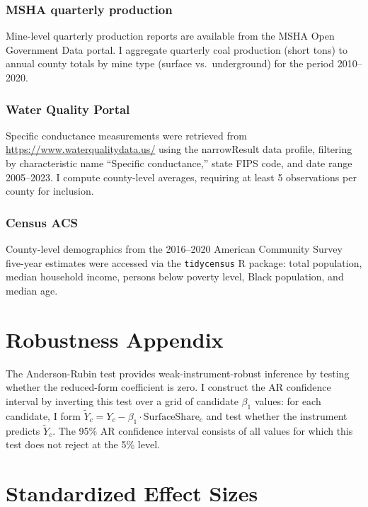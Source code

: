 \documentclass[12pt]{article}
\begin{document}
\subsubsection*{MSHA quarterly production} Mine-level quarterly production reports are available from the MSHA Open Government Data portal. I aggregate quarterly coal production (short tons) to annual county totals by mine type (surface vs.\ underground) for the period 2010--2020.

\subsubsection*{Water Quality Portal} Specific conductance measurements were retrieved from \url{https://www.waterqualitydata.us/} using the narrowResult data profile, filtering by characteristic name ``Specific conductance,'' state FIPS code, and date range 2005--2023. I compute county-level averages, requiring at least 5 observations per county for inclusion.

\subsubsection*{Census ACS} County-level demographics from the 2016--2020 American Community Survey five-year estimates were accessed via the \texttt{tidycensus} R package: total population, median household income, persons below poverty level, Black population, and median age.

\section{Robustness Appendix}
\label{sec:app_robust}

The Anderson-Rubin test provides weak-instrument-robust inference by testing whether the reduced-form coefficient is zero. I construct the AR confidence interval by inverting this test over a grid of candidate $\beta_1$ values: for each candidate, I form $\tilde{Y}_c = Y_c - \beta_1 \cdot \text{SurfaceShare}_c$ and test whether the instrument predicts $\tilde{Y}_c$. The 95\% AR confidence interval consists of all values for which this test does not reject at the 5\% level.

\section{Standardized Effect Sizes}
\label{sec:sde}


\end{document}
